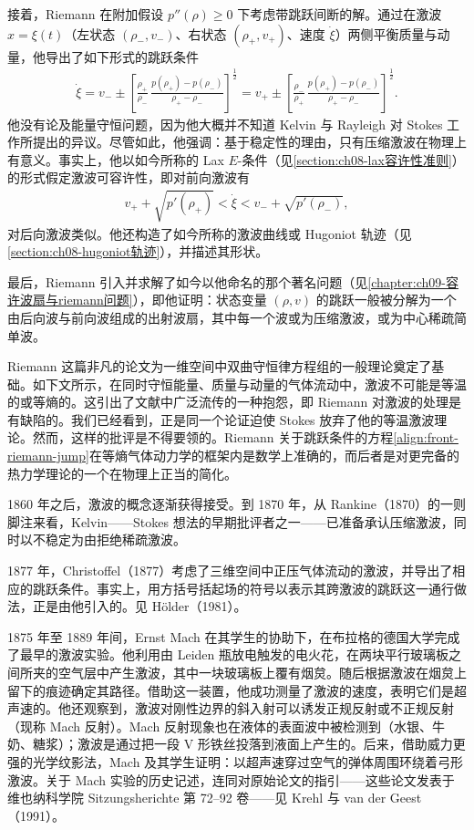 \documentclass[../../main.tex]{subfiles}
\begin{document}
接着，Riemann 在附加假设 $p''(\rho)\geqslant0$ 下考虑带跳跃间断的解。通过在激波 $x=\xi(t)$（左状态 $(\rho_-,v_-)$、右状态 $(\rho_+,v_+)$、速度 $\dot{\xi}$）两侧平衡质量与动量，他导出了如下形式的跳跃条件
\begin{align}
\dot{\xi}=v_-\pm\left[\frac{\rho_+}{\rho_-}\,\frac{p(\rho_+)-p(\rho_-)}{\rho_+-\rho_-}\right]^{\frac{1}{2}}
=v_+\pm\left[\frac{\rho_-}{\rho_+}\,\frac{p(\rho_+)-p(\rho_-)}{\rho_+-\rho_-}\right]^{\frac{1}{2}}.\label{align:front-riemann-jump}
\end{align}
他没有论及能量守恒问题，因为他大概并不知道 Kelvin 与 Rayleigh 对 Stokes 工作所提出的异议。尽管如此，他强调：基于稳定性的理由，只有压缩激波在物理上有意义。事实上，他以如今所称的 Lax $E$-条件（见\cref{section:ch08-lax容许性准则}）的形式假定激波可容许性，即对前向激波有
\begin{align}
v_++\sqrt{p'(\rho_+)}<\dot{\xi}<v_-+\sqrt{p'(\rho_-)},\label{align:front-lax-e}
\end{align}
对后向激波类似。他还构造了如今所称的激波曲线或 Hugoniot 轨迹（见\cref{section:ch08-hugoniot轨迹}），并描述其形状。

最后，Riemann 引入并求解了如今以他命名的那个著名问题（见\cref{chapter:ch09-容许波扇与riemann问题}），即他证明：状态变量 $(\rho,v)$ 的跳跃一般被分解为一个由后向波与前向波组成的出射波扇，其中每一个波或为压缩激波，或为中心稀疏简单波。

Riemann 这篇非凡的论文为一维空间中双曲守恒律方程组的一般理论奠定了基础。如下文所示，在同时守恒能量、质量与动量的气体流动中，激波不可能是等温的或等熵的。这引出了文献中广泛流传的一种抱怨，即 Riemann 对激波的处理是有缺陷的。我们已经看到，正是同一个论证迫使 Stokes 放弃了他的等温激波理论。然而，这样的批评是不得要领的。Riemann 关于跳跃条件的方程\eqref{align:front-riemann-jump}在等熵气体动力学的框架内是数学上准确的，而后者是对更完备的热力学理论的一个在物理上正当的简化。

1860 年之后，激波的概念逐渐获得接受。到 1870 年，从 Rankine（1870）的一则脚注来看，Kelvin——Stokes 想法的早期批评者之一——已准备承认压缩激波，同时以不稳定为由拒绝稀疏激波。

1877 年，Christoffel（1877）考虑了三维空间中正压气体流动的激波，并导出了相应的跳跃条件。事实上，用方括号括起场的符号以表示其跨激波的跳跃这一通行做法，正是由他引入的。见 Hölder（1981）。

1875 年至 1889 年间，Ernst Mach 在其学生的协助下，在布拉格的德国大学完成了最早的激波实验。他利用由 Leiden 瓶放电触发的电火花，在两块平行玻璃板之间所夹的空气层中产生激波，其中一块玻璃板上覆有烟炱。随后根据激波在烟炱上留下的痕迹确定其路径。借助这一装置，他成功测量了激波的速度，表明它们是超声速的。他还观察到，激波对刚性边界的斜入射可以诱发正规反射或不正规反射（现称 Mach 反射）。Mach 反射现象也在液体的表面波中被检测到（水银、牛奶、糖浆）；激波是通过把一段 V 形铁丝投落到液面上产生的。后来，借助威力更强的光学纹影法，Mach 及其学生证明：以超声速穿过空气的弹体周围环绕着弓形激波。关于 Mach 实验的历史记述，连同对原始论文的指引——这些论文发表于维也纳科学院 Sitzungsherichte 第 72--92 卷——见 Krehl 与 van der Geest（1991）。
\end{document}
